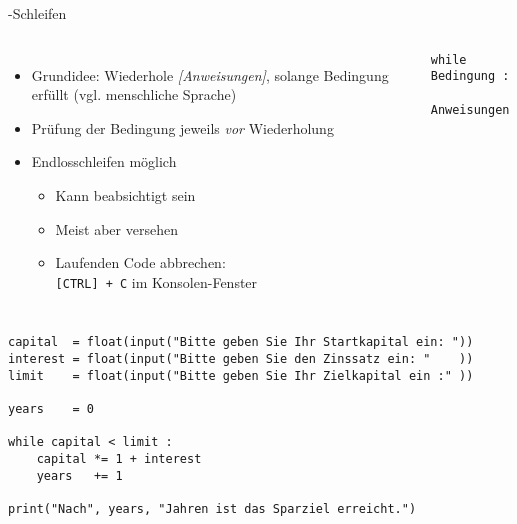 \begin{frame}[fragile]{-Schleifen}
%
\begin{columns}[T]
\begin{itemize}
\item Grundidee: Wiederhole \emph{[Anweisungen]}, solange Bedingung erfüllt (vgl. menschliche Sprache)
\item Prüfung der Bedingung jeweils \emph{vor} Wiederholung
\item Endlosschleifen möglich
	\begin{itemize}
	\item Kann beabsichtigt sein
	\item Meist aber versehen
	\item Laufenden Code abbrechen:\\
		\texttt{[CTRL] + C} im Konsolen-Fenster
	\end{itemize}
\end{itemize}
%
\begin{codebox}
\begin{verbatim}
while Bedingung :
    Anweisungen
\end{verbatim}
\end{codebox}
\end{columns}
%
\end{frame}


\begin{frame}[fragile]
%
\begin{codebox}
\begin{verbatim}
capital  = float(input("Bitte geben Sie Ihr Startkapital ein: "))
interest = float(input("Bitte geben Sie den Zinssatz ein: "    ))
limit    = float(input("Bitte geben Sie Ihr Zielkapital ein :" ))

years    = 0

while capital < limit :
    capital *= 1 + interest
    years   += 1

print("Nach", years, "Jahren ist das Sparziel erreicht.")
\end{verbatim}
\end{codebox}
%
\end{frame}

